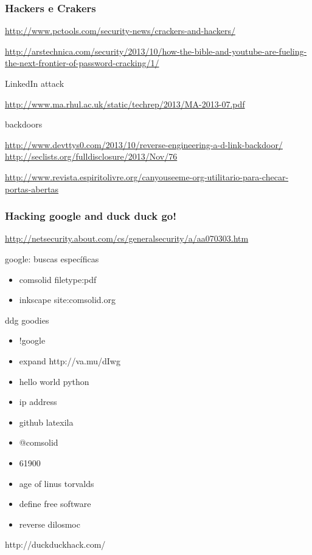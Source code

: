 \begin{frame}[fragile]\frametitle{Hackers e Crakers}

\url{http://www.pctools.com/security-news/crackers-and-hackers/}

\url{http://arstechnica.com/security/2013/10/how-the-bible-and-youtube-are-fueling-the-next-frontier-of-password-cracking/1/}

\begin{block}{LinkedIn attack}

\url{http://www.ma.rhul.ac.uk/static/techrep/2013/MA-2013-07.pdf}

\end{block}

\begin{block}{backdoors}

\url{http://www.devttys0.com/2013/10/reverse-engineering-a-d-link-backdoor/}
\url{http://seclists.org/fulldisclosure/2013/Nov/76}

\url{http://www.revista.espiritolivre.org/canyouseeme-org-utilitario-para-checar-portas-abertas}

\end{block}

\end{frame}

\begin{frame}[fragile]\frametitle{Hacking google and duck duck go!}

\url{http://netsecurity.about.com/cs/generalsecurity/a/aa070303.htm}

\begin{block}{google: buscas específicas}

\begin{itemize}
\item
  comsolid filetype:pdf
\item
  inkscape site:comsolid.org
\end{itemize}
\end{block}

\begin{block}{ddg goodies}

\begin{itemize}
\item
  !google
\item
  expand http://va.mu/dIwg
\item
  hello world python
\item
  ip address
\item
  github latexila
\item
  @comsolid
\item
  61900
\item
  age of linus torvalds
\item
  define free software
\item
  reverse dilosmoc
\end{itemize}
\end{block}

\begin{block}{http://duckduckhack.com/}

\end{block}

\end{frame}

